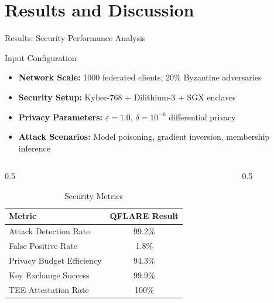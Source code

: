 \documentclass[aspectratio=169,11pt]{beamer}
\begin{document}
\section{Results and Discussion}
\begin{frame}{Results: Security Performance Analysis}

\begin{block}{Input Configuration}
\begin{itemize}
\item \textbf{Network Scale:} 1000 federated clients, 20\% Byzantine adversaries
\item \textbf{Security Setup:} Kyber-768 + Dilithium-3 + SGX enclaves
\item \textbf{Privacy Parameters:} $\varepsilon = 1.0$, $\delta = 10^{-6}$ differential privacy
\item \textbf{Attack Scenarios:} Model poisoning, gradient inversion, membership inference
\end{itemize}
\end{block}

\begin{columns}
\begin{column}{0.5\textwidth}
\begin{table}[h]
\centering
\footnotesize
\caption{Security Metrics}
\begin{tabular}{@{}lc@{}}
\toprule
\textbf{Metric} & \textbf{QFLARE Result} \\
\midrule
Attack Detection Rate & 99.2\% \\
False Positive Rate & 1.8\% \\
Privacy Budget Efficiency & 94.3\% \\
Key Exchange Success & 99.9\% \\
TEE Attestation Rate & 100\% \\
\bottomrule
\end{tabular}
\end{table}
\end{column}

\begin{column}{0.5\textwidth}
\end{column}
\end{columns}

\end{frame}
\end{document}
